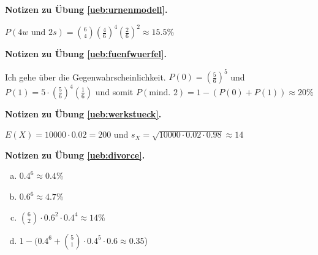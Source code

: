\documentclass[%
11pt,%
twoside,%
titlepage,%
german,%
headsepline%
]{scrartcl}
\newcommand{\concatueb}[1]{ueb:#1}%
\newcommand{\concatlsg}[1]{lsg:#1}%
\newenvironment{lsg}[1]{%
    \par\noindent\textbf{Notizen zu Übung \ref{\concatueb{#1}}.}%
    \label{\concatlsg{#1}}
}{%
    \par%
}
\begin{document}
\begin{lsg}{urnenmodell}
    $P(4w\text{ und }2s)=\binom{6}{4}(\frac{4}{6})^4(\frac{2}{6})^2\approx15.5\%$
\end{lsg}
\begin{lsg}{fuenfwuerfel}
    Ich gehe über die Gegenwahrscheinlichkeit. $P(0)=(\frac{5}{6})^5$ und $P(1)=5\cdot(\frac{5}{6})^4(\frac{1}{6})$ und somit $P(\text{mind. }2)=1-(P(0)+P(1))\approx20\%$
\end{lsg}
\begin{lsg}{werkstueck}
    $E(X)=10000\cdot0.02=200$ und $s_X=\sqrt{10000\cdot0.02\cdot0.98}\approx14$
\end{lsg}
\begin{lsg}{divorce}
    \begin{enumerate}[a)]
        \item $0.4^6\approx0.4\%$
        \item $0.6^6\approx4.7\%$
        \item $\binom{6}{2}\cdot0.6^2\cdot0.4^4\approx14\%$
        \item $1-(0.4^6+\binom{5}{1}\cdot0.4^5\cdot0.6\approx0.35$)
    \end{enumerate}
\end{lsg}
\end{document}
